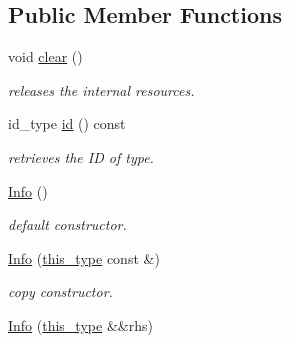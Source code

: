 \subsection*{Public Member Functions}
\begin{DoxyCompactItemize}
\item 
\hypertarget{classhryky_1_1type_1_1_info_a9c13cc8a9047c9028a4ef14cacc787ad}{void \hyperlink{classhryky_1_1type_1_1_info_a9c13cc8a9047c9028a4ef14cacc787ad}{clear} ()}\label{classhryky_1_1type_1_1_info_a9c13cc8a9047c9028a4ef14cacc787ad}

\begin{DoxyCompactList}\small\item\em releases the internal resources. \end{DoxyCompactList}\item 
\hypertarget{classhryky_1_1type_1_1_info_a4672274a2da263baa10f7fd2e35f94e2}{id\-\_\-type \hyperlink{classhryky_1_1type_1_1_info_a4672274a2da263baa10f7fd2e35f94e2}{id} () const }\label{classhryky_1_1type_1_1_info_a4672274a2da263baa10f7fd2e35f94e2}

\begin{DoxyCompactList}\small\item\em retrieves the I\-D of type. \end{DoxyCompactList}\item 
\hypertarget{classhryky_1_1type_1_1_info_ae457ac9d30765e0a6513c9566c705a89}{\hyperlink{classhryky_1_1type_1_1_info_ae457ac9d30765e0a6513c9566c705a89}{Info} ()}\label{classhryky_1_1type_1_1_info_ae457ac9d30765e0a6513c9566c705a89}

\begin{DoxyCompactList}\small\item\em default constructor. \end{DoxyCompactList}\item 
\hypertarget{classhryky_1_1type_1_1_info_adca28fabff6f4b8c59337308b71fbefc}{\hyperlink{classhryky_1_1type_1_1_info_adca28fabff6f4b8c59337308b71fbefc}{Info} (\hyperlink{classhryky_1_1type_1_1_info_add4519e2ccc4c1ea0266694bc15135b7}{this\-\_\-type} const \&)}\label{classhryky_1_1type_1_1_info_adca28fabff6f4b8c59337308b71fbefc}

\begin{DoxyCompactList}\small\item\em copy constructor. \end{DoxyCompactList}\item 
\hypertarget{classhryky_1_1type_1_1_info_aaf43456ef4e4b39d29af4e18a2c8e563}{\hyperlink{classhryky_1_1type_1_1_info_aaf43456ef4e4b39d29af4e18a2c8e563}{Info} (\hyperlink{classhryky_1_1type_1_1_info_add4519e2ccc4c1ea0266694bc15135b7}{this\-\_\-type} \&\&rhs)}\label{classhryky_1_1type_1_1_info_aaf43456ef4e4b39d29af4e18a2c8e563}


\end{DoxyCompactItemize}

